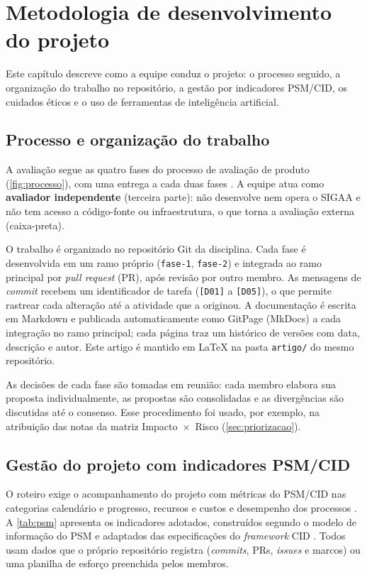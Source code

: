 \chapter{Metodologia de desenvolvimento do projeto}
\label{cap:metodologia}

Este capítulo descreve como a equipe conduz o projeto: o processo seguido, a organização do trabalho no repositório, a gestão por indicadores PSM/CID, os cuidados éticos e o uso de ferramentas de inteligência artificial.

\section{Processo e organização do trabalho}
\label{sec:processo-trabalho}

A avaliação segue as quatro fases do processo de avaliação de produto (\autoref{fig:processo}), com uma entrega a cada duas fases \cite{ramos2026roteiro}. A equipe atua como \textbf{avaliador independente} (terceira parte): não desenvolve nem opera o SIGAA e não tem acesso a código-fonte ou infraestrutura, o que torna a avaliação externa (caixa-preta).

O trabalho é organizado no repositório Git da disciplina. Cada fase é desenvolvida em um ramo próprio (\texttt{fase-1}, \texttt{fase-2}) e integrada ao ramo principal por \textit{pull request} (PR), após revisão por outro membro. As mensagens de \textit{commit} recebem um identificador de tarefa (\texttt{[D01]} a \texttt{[D05]}), o que permite rastrear cada alteração até a atividade que a originou. A documentação é escrita em Markdown e publicada automaticamente como GitPage (MkDocs) a cada integração no ramo principal; cada página traz um histórico de versões com data, descrição e autor. Este artigo é mantido em LaTeX na pasta \texttt{artigo/} do mesmo repositório.

As decisões de cada fase são tomadas em reunião: cada membro elabora sua proposta individualmente, as propostas são consolidadas e as divergências são discutidas até o consenso. Esse procedimento foi usado, por exemplo, na atribuição das notas da matriz Impacto~$\times$~Risco (\autoref{sec:priorizacao}).

\section{Gestão do projeto com indicadores PSM/CID}
\label{sec:gestao}

O roteiro exige o acompanhamento do projeto com métricas do PSM/CID nas categorias calendário e progresso, recursos e custos e desempenho dos processos \cite{ramos2026roteiro}. A \autoref{tab:psm} apresenta os indicadores adotados, construídos segundo o modelo de informação do PSM \cite{mcgarry2002} e adaptados das especificações do \textit{framework} CID \cite{psmcid2}. Todos usam dados que o próprio repositório registra (\textit{commits}, PRs, \textit{issues} e marcos) ou uma planilha de esforço preenchida pelos membros.

